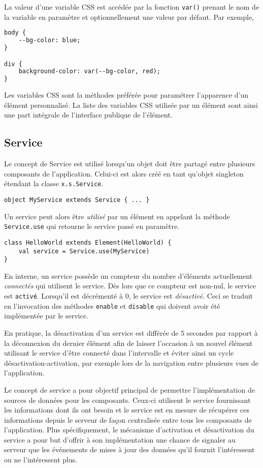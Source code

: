 La valeur d'une variable CSS est accédée par la fonction \texttt{var()} prenant le nom de la variable en paramètre et optionnellement une valeur par défaut. Par exemple,
\begin{lstlisting}[language=HTML]
body {
	--bg-color: blue;
}

div {
	background-color: var(--bg-color, red);
}
\end{lstlisting}

Les variables CSS sont la méthodes préférée pour paramétrer l'apparence d'un élément personnalisé. La liste des variables CSS utilisée par un élément sont ainsi une part intégrale de l'interface publique de l'élément.

\subsection{Service}

Le concept de Service est utilisé lorsqu'un objet doit être partagé entre plusieurs composants de l'application. Celui-ci est alors créé en tant qu'objet singleton étendant la classe \texttt{x.s.Service}.
\begin{lstlisting}
object MyService extends Service { ... }
\end{lstlisting}

Un service peut alors être \emph{utilisé} par un élément en appelant la méthode \texttt{Service.use} qui retourne le service passé en paramètre.
\begin{lstlisting}
class HelloWorld extends Element(HelloWorld) {
	val service = Service.use(MyService)
}
\end{lstlisting}

En interne, un service possède un compteur du nombre d'éléments actuellement \emph{connectés} qui utilisent le service. Dès lors que ce compteur est non-nul, le service est \texttt{activé}. Lorsqu'il est décrémenté à 0, le service est \emph{désactivé}. Ceci se traduit en l'invocation des méthodes \texttt{enable} et \texttt{disable} qui doivent avoir été implémentée par le service.

En pratique, la désactivation d'un service est différée de 5 secondes par rapport à la déconnexion du dernier élément afin de laisser l'occasion à un nouvel élément utilisant le service d'être connecté dans l'intervalle et éviter ainsi un cycle désactivation-activation, par exemple lors de la navigation entre plusieurs vues de l'application.

Le concept de service a pour objectif principal de permettre l'implémentation de sources de données pour les composants. Ceux-ci utilisent le service fournissant les informations dont ils ont besoin et le service est en mesure de récupérer ces informations depuis le serveur de façon centralisée entre tous les composants de l'application. Plus spécifiquement, le mécanisme d'activation et désactivation du service a pour but d'offrir à son implémentation une chance de signaler au serveur que les événements de mises à jour des données qu'il fournit l'intéressent ou ne l'intéressent plus.

